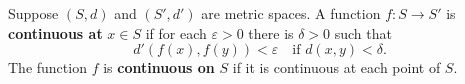Suppose $(S, d)$ and $(S', d')$ are metric spaces. A function $f: S \to S'$ is \textbf{continuous at} $x \in S$ if for each $\varepsilon > 0$ there is $\delta > 0$ such that
$$d'(f(x), f(y)) < \varepsilon \quad \text{if } d(x, y) < \delta.$$
The function $f$ is \textbf{continuous on} $S$ if it is continuous at each point of $S$.
